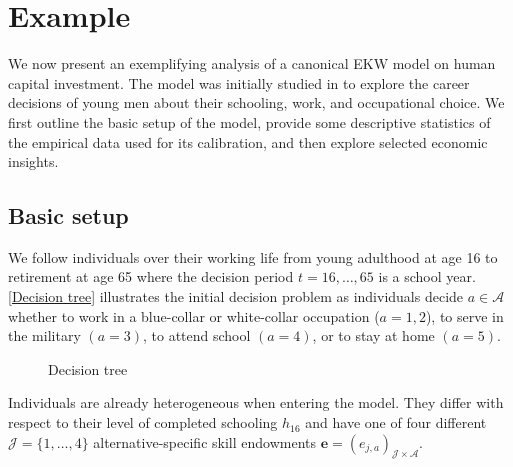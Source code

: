 \section{Example}\label{Example}
We now present an exemplifying analysis of a canonical EKW model on human capital investment. The model was initially studied in \citet{Keane.1997} to explore the career decisions of young men about their schooling, work, and occupational choice. We first outline the basic setup of the model, provide some descriptive statistics of the empirical data used for its calibration, and then explore selected economic insights.
\subsection{Basic setup}
We follow individuals over their working life from young adulthood at age 16 to retirement at age 65 where the decision period $t = 16, \dots, 65$  is a school year. \autoref{Decision tree}%
illustrates the initial decision problem as individuals decide $a\in\mathcal{A}$ whether to work in a blue-collar or white-collar occupation ($a = 1, 2$), to serve in the military $(a = 3)$, to attend school $(a = 4)$, or to stay at home $(a = 5)$.

%
\begin{figure}[t!]\centering
	\scalebox{0.75}{%
	}
	\caption{Decision tree}
	\label{Decision tree}
\end{figure}%
%

Individuals are already heterogeneous when entering the model. They differ with respect to their level of completed schooling $h_{16}$ and have one of four different $\mathcal{J} = \{1, \hdots, 4\}$ alternative-specific skill endowments $\bm{e} = \left(e_{j,a}\right)_{\mathcal{J} \times \mathcal{A}}$.

